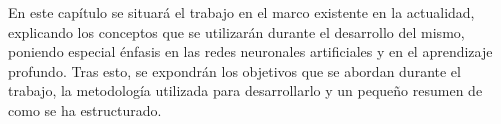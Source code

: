 \documentclass[a4paper, 12pt, spanish, chapterprefix, numbers=noenddot]{book}
\begin{document}
En este capítulo se situará el trabajo en el marco existente en la actualidad, explicando los conceptos que se utilizarán durante el desarrollo del mismo, poniendo especial énfasis en las redes neuronales artificiales y en el aprendizaje profundo. Tras esto, se expondrán los objetivos que se abordan durante el trabajo, la metodología utilizada para desarrollarlo y un pequeño resumen de como se ha estructurado.

\begin{comment}
\section{Contexto y motivación}

Una de las fuentes de inspiración matemáticas ha sido el continuo intento de formalizar el pensamiento humano. La complejidad para simular acciones humanas frente a otras teorías matemáticas ha hecho que se separen los campos de estudio y aplicación.\\

Comenzando en la década de 1940 y con una gran aceleración en la década de 1980, se ha hecho un gran esfuerzo por modelar la cognición utilizando formalismos basados en modelos cada vez más sofisticados de la fisiología de las neuronas. Algunas ramas de este trabajo se siguen enfocando en la teoría biológica y psicológica, pero como ocurrió en el pasado, estos formalismos están adquiriendo una vida matemática y de aplicación propia. Muchas variedades de redes adaptativas han demostrado ser prácticas enfrentándose a problemas de gran dificultad, convirtiendo el estudio de sus propiedades matemáticas y computacionales en un campo muy interesante de estudio.\\

La investigación en el campo de las redes neuronales ha atraído cada vez más atención en los años recientes. Desde 1943, cuando Warren McCulloch y Walter Pitts presentaron el primer modelo de neuronas artificiales, nuevas y más sofisticadas propuestas se han hecho década tras década. El análisis matemático de estas propuestas ha resuelto algunos de los misterios planteados por los nuevos modelos pero también ha dejado muchas preguntas abiertas para futuras investigaciones. Cabe destacar que el estudio de las neuronas, sus interconexiones y su papel dentro del cerebro es uno de los campos de investigación más dinámicos e importantes en la biología moderna. Esta relevancia se puede ilustrar señalando que entre los años 1901 y 1991, aproximadamente el 10\% de los Premios Nobel de Fisiología y Medicina fueron otorgados a científicos que contribuyeron a la comprensión del cerebro. No es una exageración decir que se ha aprendido más del sistema nervioso en los últimos 50 años que nunca antes.\\


\end{comment}
\end{document}
